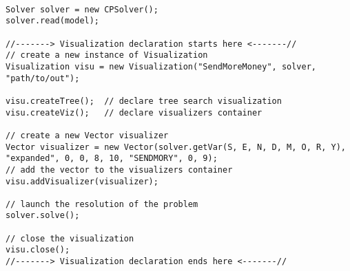 \begin{lstlisting}[title=SendMoreMoney problem,captionpos=b]
                                                                                                                 
Solver solver = new CPSolver();                                                                                  
solver.read(model);                                                                                              
                                                                                                                 
//-------> Visualization declaration starts here <-------//                                                  
// create a new instance of Visualization                                                                        
Visualization visu = new Visualization("SendMoreMoney", solver, "path/to/out");                                   
                                                                                                                 
visu.createTree();  // declare tree search visualization                                                         
visu.createViz();   // declare visualizers container                                                             
                                                                                                                 
// create a new Vector visualizer                                                                                
Vector visualizer = new Vector(solver.getVar(S, E, N, D, M, O, R, Y), "expanded", 0, 0, 8, 10, "SENDMORY", 0, 9);
// add the vector to the visualizers container                                                                   
visu.addVisualizer(visualizer);                                                                                  
                                                                                                                 
// launch the resolution of the problem                                                                          
solver.solve();                                                                                                  
                                                                                                                 
// close the visualization                                                                                       
visu.close();                                                                                                    
//-------> Visualization declaration ends here <-------//                                                    
\end{lstlisting}

